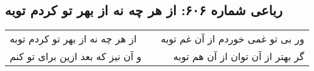 \begin{center}
\section*{رباعی شماره ۶۰۶: از هر چه نه از بهر تو کردم توبه}
\label{sec:sh606}
\begin{longtable}{l p{0.5cm} r}
از هر چه نه از بهر تو کردم توبه
&&
ور بی تو غمی خوردم از آن غم توبه
\\
و آن نیز که بعد ازین برای تو کنم
&&
گر بهتر از آن توان از آن هم توبه
\\
\end{longtable}
\end{center}

